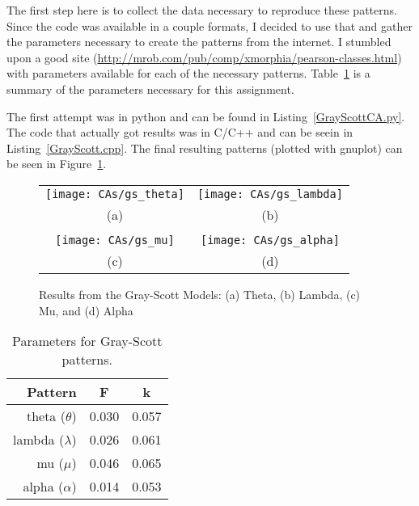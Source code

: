The first step here is to collect the data necessary to reproduce these patterns. Since the code was available in a couple formats, I decided to use that and gather the parameters necessary to create the patterns from the internet. I stumbled upon a good site (\url{http://mrob.com/pub/comp/xmorphia/pearson-classes.html}) with parameters available for each of the necessary patterns. Table~\ref{pattern_params} is a summary of the parameters necessary for this assignment.

The first attempt was in python and can be found in Listing~\ref{GrayScottCA.py}. The code that actually got results was in C/C++ and can be seein in Listing~\ref{GrayScott.cpp}. The final resulting patterns (plotted with gnuplot) can be seen in Figure~\ref{grayscott_results}.

\begin{figure}
\centering
\begin{tabular}{ c c }
\texttt{[image: CAs/gs\_theta]} &
\texttt{[image: CAs/gs\_lambda]} \\
(a) & (b) \\ \\
\texttt{[image: CAs/gs\_mu]} &
\texttt{[image: CAs/gs\_alpha]} \\
(c) & (d) \\
\end{tabular}
\caption{Results from the Gray-Scott Models: (a) Theta, (b) Lambda, (c) Mu, and (d) Alpha}
\label{grayscott_results}
\end{figure}

\begin{table}
\centering
\begin{tabular}{ r | c c }
Pattern & F & k \\
\hline
theta ($\theta$) & 0.030 & 0.057 \\
lambda ($\lambda$) & 0.026 & 0.061 \\
mu ($\mu$) & 0.046 & 0.065 \\
alpha ($\alpha$) & 0.014 & 0.053
\end{tabular}
\caption{Parameters for Gray-Scott patterns.}
\label{pattern_params}
\end{table}
